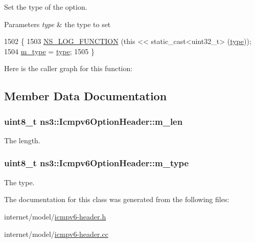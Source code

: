 Set the type of the option. 


\begin{DoxyParams}{Parameters}
{\em type} & the type to set \\
\hline
\end{DoxyParams}

\begin{DoxyCode}
1502 \{
1503   \hyperlink{log-macros-disabled_8h_a90b90d5bad1f39cb1b64923ea94c0761}{NS\_LOG\_FUNCTION} (\textcolor{keyword}{this} << static\_cast<uint32\_t> (\hyperlink{visualizer-ideas_8txt_add98db9e15e2a58cf2b57623e7aa893a}{type}));
1504   \hyperlink{classns3_1_1Icmpv6OptionHeader_a6829e48e1a7a76831bc7ec8c8d82628c}{m\_type} = \hyperlink{visualizer-ideas_8txt_add98db9e15e2a58cf2b57623e7aa893a}{type};
1505 \}
\end{DoxyCode}


Here is the caller graph for this function\+:




\subsection{Member Data Documentation}
\subsubsection[{\texorpdfstring{m\+\_\+len}{m_len}}]{\setlength{\rightskip}{0pt plus 5cm}uint8\+\_\+t ns3\+::\+Icmpv6\+Option\+Header\+::m\+\_\+len\hspace{0.3cm}{\ttfamily [private]}}\hypertarget{classns3_1_1Icmpv6OptionHeader_a42ea7d3b1237afa3d8bd7b49f294dd4d}{}\label{classns3_1_1Icmpv6OptionHeader_a42ea7d3b1237afa3d8bd7b49f294dd4d}


The length. 

\subsubsection[{\texorpdfstring{m\+\_\+type}{m_type}}]{\setlength{\rightskip}{0pt plus 5cm}uint8\+\_\+t ns3\+::\+Icmpv6\+Option\+Header\+::m\+\_\+type\hspace{0.3cm}{\ttfamily [private]}}\hypertarget{classns3_1_1Icmpv6OptionHeader_a6829e48e1a7a76831bc7ec8c8d82628c}{}\label{classns3_1_1Icmpv6OptionHeader_a6829e48e1a7a76831bc7ec8c8d82628c}


The type. 



The documentation for this class was generated from the following files\+:\begin{DoxyCompactItemize}
\item 
internet/model/\hyperlink{icmpv6-header_8h}{icmpv6-\/header.\+h}\item 
internet/model/\hyperlink{icmpv6-header_8cc}{icmpv6-\/header.\+cc}\end{DoxyCompactItemize}
